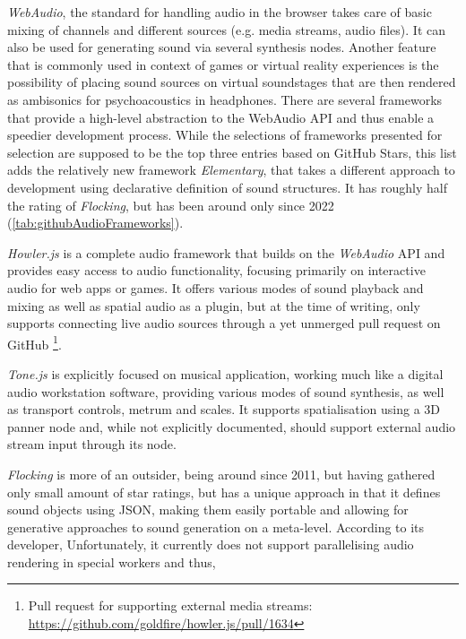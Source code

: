 \emph{WebAudio}, the standard for handling audio in the browser takes care of basic mixing of channels and different sources (e.g. media streams, audio files). It can also be used for generating sound via several synthesis nodes. Another feature that is commonly used in context of games or virtual reality experiences is the possibility of placing sound sources on virtual soundstages that are then rendered as ambisonics for psychoacoustics in headphones. There are several frameworks that provide a high-level abstraction to the WebAudio \ac{API} and thus enable a speedier development process. While the selections of frameworks presented for selection are supposed to be the top three entries based on GitHub Stars, this list adds the relatively new framework \emph{Elementary}, that takes a different approach to development using declarative definition of sound structures. It has roughly half the rating of \emph{Flocking}, but has been around only since 2022 (\ref{tab:githubAudioFrameworks}).



\emph{Howler.js} is a complete audio framework that builds on the \emph{WebAudio} \ac{API} and provides easy access to audio functionality, focusing primarily on interactive audio for web apps or games. It offers various modes of sound playback and mixing as well as spatial audio as a plugin, but at the time of writing, only supports connecting live audio sources through a yet unmerged pull request on GitHub \footnote{Pull request for supporting external media streams: \href{https://github.com/goldfire/howler.js/pull/1634}{https://github.com/goldfire/howler.js/pull/1634}}.

\emph{Tone.js} is explicitly focused on musical application, working much like a digital audio workstation software, providing various modes of sound synthesis, as well as transport controls, metrum and scales. It supports spatialisation using a \ac{3D} panner node and, while not explicitly documented, should support external audio stream input through its  node.

\emph{Flocking} is more of an outsider, being around since 2011, but having gathered only small amount of star ratings, but has a unique approach in that it defines sound objects using \ac{JSON}, making them easily portable and allowing for generative approaches to sound generation on a meta-level. According to its developer,  Unfortunately, it currently does not support parallelising audio rendering in special workers and thus, 

